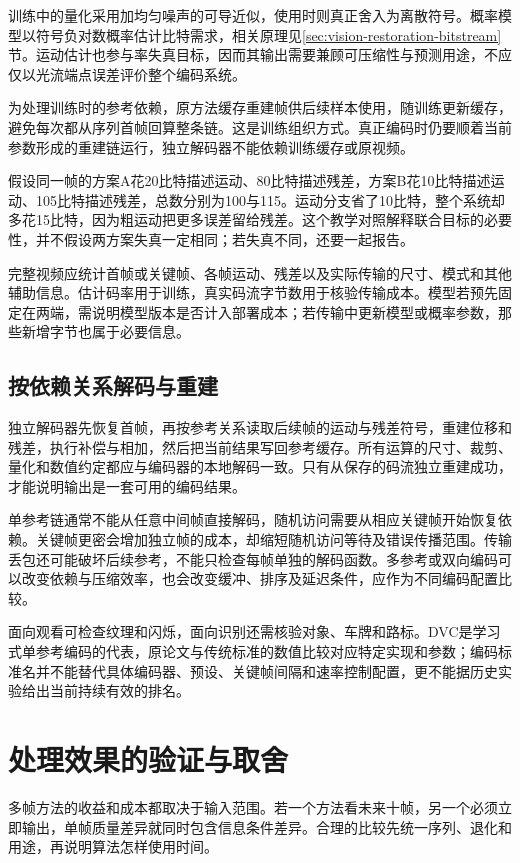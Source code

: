 训练中的量化采用加均匀噪声的可导近似，使用时则真正舍入为离散符号。概率模型以符号负对数概率估计比特需求，相关原理见\ref{sec:vision-restoration-bitstream}节。运动估计也参与率失真目标，因而其输出需要兼顾可压缩性与预测用途，不应仅以光流端点误差评价整个编码系统。

为处理训练时的参考依赖，原方法缓存重建帧供后续样本使用，随训练更新缓存，避免每次都从序列首帧回算整条链。这是训练组织方式。真正编码时仍要顺着当前参数形成的重建链运行，独立解码器不能依赖训练缓存或原视频。

假设同一帧的方案A花20比特描述运动、80比特描述残差，方案B花10比特描述运动、105比特描述残差，总数分别为100与115。运动分支省了10比特，整个系统却多花15比特，因为粗运动把更多误差留给残差。这个教学对照解释联合目标的必要性，并不假设两方案失真一定相同；若失真不同，还要一起报告。

完整视频应统计首帧或关键帧、各帧运动、残差以及实际传输的尺寸、模式和其他辅助信息。估计码率用于训练，真实码流字节数用于核验传输成本。模型若预先固定在两端，需说明模型版本是否计入部署成本；若传输中更新模型或概率参数，那些新增字节也属于必要信息。

\subsection{按依赖关系解码与重建}
\label{sec:vision-video-decoding}

独立解码器先恢复首帧，再按参考关系读取后续帧的运动与残差符号，重建位移和残差，执行补偿与相加，然后把当前结果写回参考缓存。所有运算的尺寸、裁剪、量化和数值约定都应与编码器的本地解码一致。只有从保存的码流独立重建成功，才能说明输出是一套可用的编码结果。

单参考链通常不能从任意中间帧直接解码，随机访问需要从相应关键帧开始恢复依赖。关键帧更密会增加独立帧的成本，却缩短随机访问等待及错误传播范围。传输丢包还可能破坏后续参考，不能只检查每帧单独的解码函数。多参考或双向编码可以改变依赖与压缩效率，也会改变缓冲、排序及延迟条件，应作为不同编码配置比较。

面向观看可检查纹理和闪烁，面向识别还需核验对象、车牌和路标。DVC是学习式单参考编码的代表，原论文与传统标准的数值比较对应特定实现和参数；编码标准名并不能替代具体编码器、预设、关键帧间隔和速率控制配置，更不能据历史实验给出当前持续有效的排名。

\section{处理效果的验证与取舍}
\label{sec:vision-video-restoration-evaluation}

多帧方法的收益和成本都取决于输入范围。若一个方法看未来十帧，另一个必须立即输出，单帧质量差异就同时包含信息条件差异。合理的比较先统一序列、退化和用途，再说明算法怎样使用时间。

